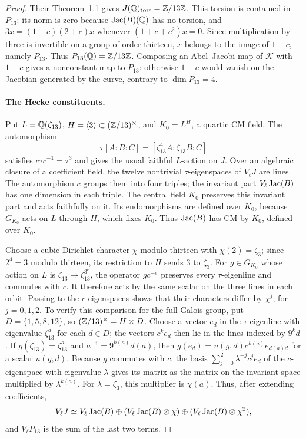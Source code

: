 \begin{proof}
Their Theorem~1.1 gives $J(\mathbb Q)_{\rm tors}=\mathbb Z/13\mathbb Z$.
This torsion is contained in $P_{13}$: its norm is zero because
$\operatorname{Jac}(B)(\mathbb Q)$ has no torsion, and
$3x=(1-c)(2+c)x$ whenever $(1+c+c^2)x=0$.
Since multiplication by three is invertible on a group of order
thirteen, $x$ belongs to the image of $1-c$, namely $P_{13}$.
Thus $P_{13}(\mathbb Q)=\mathbb Z/13\mathbb Z$.
Composing an Abel--Jacobi map of $\mathcal K$ with $1-c$ gives a
nonconstant map to $P_{13}$: otherwise $1-c$ would vanish on the
Jacobian generated by the curve, contrary to $\dim P_{13}=4$.

\paragraph{The Hecke constituents.}
Put $L=\mathbb Q(\zeta_{13})$, $H=\langle3\rangle\subset(\mathbb Z/13)^\times$,
and $K_0=L^H$, a quartic CM field. The automorphism
\[
 \tau[A:B:C]=[\zeta_{13}^4 A:\zeta_{13}B:C]
\]
satisfies $c\tau c^{-1}=\tau^3$ and gives the usual faithful
$L$-action on $J$. Over an algebraic closure of a coefficient field,
the twelve nontrivial $\tau$-eigenspaces of $V_\ell J$ are lines.
The automorphism $c$ groups them into four triples; the invariant
part $V_\ell\operatorname{Jac}(B)$ has one dimension in each triple.
The central field $K_0$ preserves this invariant part and acts
faithfully on it. Its endomorphisms are defined over $K_0$, because
$G_{K_0}$ acts on $L$ through $H$, which fixes $K_0$.
Thus $\operatorname{Jac}(B)$ has CM by $K_0$, defined over $K_0$.

Choose a cubic Dirichlet character $\chi$ modulo thirteen with
$\chi(2)=\zeta_3$; since $2^4=3$ modulo thirteen, its restriction
to $H$ sends $3$ to $\zeta_3$.
For $g\in G_{K_0}$ whose action on $L$ is $\zeta_{13}\mapsto
\zeta_{13}^{3^e}$, the operator $gc^{-e}$ preserves every
$\tau$-eigenline and commutes with $c$. It therefore acts by the
same scalar on the three lines in each orbit. Passing to the
$c$-eigenspaces shows that their characters differ by $\chi^j$,
for $j=0,1,2$.
To verify this comparison for the full Galois group, put
$D=\{1,5,8,12\}$, so $(\mathbb Z/13)^\times=H\times D$.
Choose a vector $e_d$ in the $\tau$-eigenline with eigenvalue
$\zeta_{13}^d$ for each $d\in D$; the vectors $c^ke_d$
then lie in the lines indexed by $9^kd$.
If $g(\zeta_{13})=\zeta_{13}^a$ and
$a^{-1}=9^{k(a)}d(a)$, then
$g(e_d)=u(g,d)c^{k(a)}e_{d(a)d}$ for a scalar $u(g,d)$.
Because $g$ commutes with $c$, the basis
$\sum_{j=0}^2\lambda^{-j}c^je_d$ of the $c$-eigenspace
with eigenvalue $\lambda$ gives its matrix as the matrix on the
invariant space multiplied by $\lambda^{k(a)}$.
For $\lambda=\zeta_3$, this multiplier is $\chi(a)$.
Thus, after extending coefficients,
\begin{equation}\label{eq:thirteen-twists}
 V_\ell J\simeq V_\ell\operatorname{Jac}(B)\oplus
 (V_\ell\operatorname{Jac}(B)\otimes\chi)\oplus
 (V_\ell\operatorname{Jac}(B)\otimes\chi^2),
\end{equation}
and $V_\ell P_{13}$ is the sum of the last two terms.


\end{proof}
